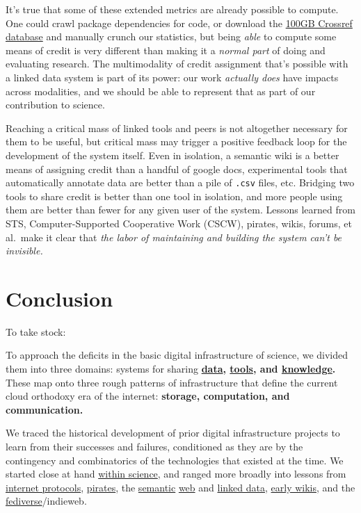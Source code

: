 It's true that some of these extended metrics are already possible to
compute. One could crawl package dependencies for code, or download the
\href{https://academictorrents.com/details/e4287cb7619999709f6e9db5c359dda17e93d515}{100GB
Crossref database} \citep{crossrefJanuary2021Public2021}  and
manually crunch our statistics, but being \emph{able} to compute some
means of credit is very different than making it a \emph{normal part} of
doing and evaluating research. The multimodality of credit assignment
that's possible with a linked data system is part of its power: our work
\emph{actually does} have impacts across modalities, and we should be
able to represent that as part of our contribution to science.

Reaching a critical mass of linked tools and peers is not altogether
necessary for them to be useful, but critical mass may trigger a
positive feedback loop for the development of the system itself. Even in
isolation, a semantic wiki is a better means of assigning credit than a
handful of google docs, experimental tools that automatically annotate
data are better than a pile of \texttt{.csv} files, etc. Bridging two
tools to share credit is better than one tool in isolation, and more
people using them are better than fewer for any given user of the
system. Lessons learned from STS, Computer-Supported Cooperative Work
(CSCW), pirates, wikis, forums, et al.~make it clear that \emph{the
labor of maintaining and building the system can't be invisible.}

\hypertarget{conclusion}{%
\chapter{Conclusion}\label{conclusion}}

To take stock:

To approach the deficits in the basic digital infrastructure of science,
we divided them into three domains: systems for sharing
\textbf{\protect\hyperlink{shared-data}{data},
\protect\hyperlink{shared-tools}{tools}, and
\protect\hyperlink{shared-knowledge}{knowledge}.} These map onto three
rough patterns of infrastructure that define the current cloud orthodoxy
era of the internet: \textbf{storage, computation, and communication.}

We traced the historical development of prior digital infrastructure projects to learn
from their successes and failures, conditioned as they are by the
contingency and combinatorics of the technologies that existed at the
time. We started close at hand
\protect\hyperlink{misincentives-in-scientific-software}{within
science}, and ranged more broadly into lessons from
\protect\hyperlink{protocols-not-platforms}{internet protocols},
\protect\hyperlink{archives-need-communities}{pirates}, the
\protect\hyperlink{the-long-now-of-immediacy-vs-idealism}{semantic}
\protect\hyperlink{neatness-vs-scruffiness}{web} and
\protect\hyperlink{folk-federation}{linked data},
\protect\hyperlink{the-wiki-way}{early wikis}, and the
\protect\hyperlink{forums--feeds}{fediverse}/indieweb.

